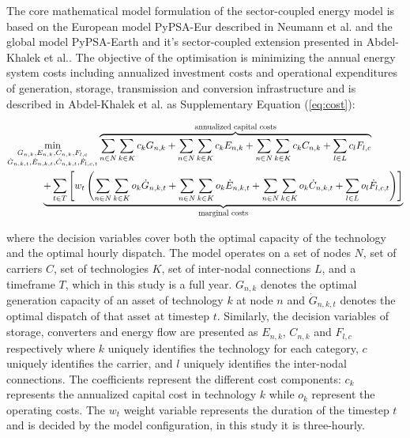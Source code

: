 \label{subsec:math-formulation}

The core mathematical model formulation of the sector-coupled energy model is based on the European model PyPSA-Eur described in Neumann et al.\cite{Neumann2023} and the global model PyPSA-Earth and it's sector-coupled extension presented in Abdel-Khalek et al.\cite{Abdel-Khalek2025}. The objective of the optimisation is minimizing the annual energy system costs including annualized investment costs and operational expenditures of generation, storage, transmission and conversion infrastructure\cite{Neumann2023} and is described in Abdel-Khalek et al.\cite{Abdel-Khalek2025} as Supplementary Equation (\ref{eq:cost}):

\begin{equation}
    \begin{aligned}
        \min _{\substack{G_{n, k}, E_{n, k},  C_{n, k}, F_{l, c} \\ \dot{G}_{n, k, t}, \dot{E}_{n, k, t},\dot{C}_{n, k, t}, \dot{F}_{l, c, t}}} &\overbrace{\sum_{n \in N} \sum_{k \in K} c_{k} G_{n, k}+\sum_{n \in N} \sum_{k \in K} c_{k} E_{n, k}+\sum_{n \in N} \sum_{k \in K} c_{k} C_{n, k}+\sum_{l \in L} c_l F_{l,c}}^{\mathclap{\scalebox{0.8}{\text{annualized capital costs}}}}\\
        &\hspace{-2cm}\underbrace{+\sum_{t \in T} \left[w_t\left(\sum_{n \in N} \sum_{k\in K} o_{k} \dot{G}_{n, k, t}+\sum_{n \in N} \sum_{k \in K} o_{k} \dot{E}_{n, k, t}+\sum_{n \in N} \sum_{k \in K} o_{k} \dot{C}_{n, k, t}+\sum_{l \in L} o_{l} \dot{F}_{l, c, t}\right)\right]}_{\mathclap{\scalebox{0.8}{\text{marginal costs}}}}
    \end{aligned}
    \label{eq:cost}
\end{equation}

where the decision variables cover both the optimal capacity of the technology and the optimal hourly dispatch. The model operates on a set of nodes $N$, set of carriers $C$, set of technologies $K$, set of inter-nodal connections $L$, and a timeframe $T$, which in this study is a full year. $G_{n, k}$ denotes the optimal generation capacity of an asset of technology $k$ at node $n$ and $\dot{G}_{n, k, t}$ denotes the optimal dispatch of that asset at timestep $t$. Similarly, the decision variables of storage, converters and energy flow are presented as $E_{n,k}$, $C_{n,k}$ and $F_{l,c}$ respectively where $k$ uniquely identifies the technology for each category, $c$ uniquely identifies the carrier, and $l$ uniquely identifies the inter-nodal connections. The coefficients represent the different cost components: $c_k$ represents the annualized capital cost in technology $k$ while $o_k$ represent the operating costs. The $w_t$ weight variable represents the duration of the timestep $t$ and is decided by the model configuration, in this study it is three-hourly.

